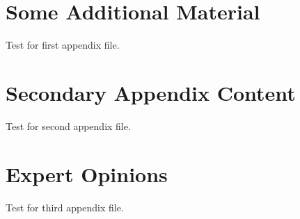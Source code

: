 \chapter{Some Additional Material}

Test for first appendix file.

\chapter{Secondary Appendix Content}

Test for second appendix file.


\chapter{Expert Opinions}

Test for third appendix file.


